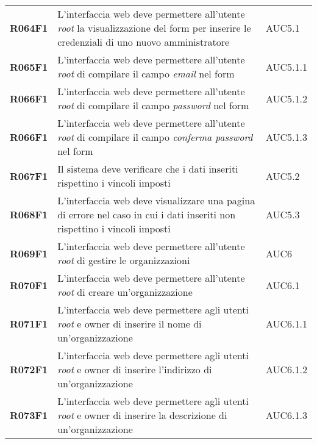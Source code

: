 \documentclass[../analisi-dei-requisiti]{subfiles}
\begin{document}
\begin{longtable}[H]{>{\centering\bfseries}m{3cm} >{\centering}m{10cm} >{\centering\arraybackslash}m{3cm}}
  R064F1                  & L'interfaccia web deve permettere all'utente \textit{root} la visualizzazione del form per inserire le credenziali di uno nuovo amministratore & AUC5.1                        \\
  R065F1                  & L'interfaccia web deve permettere all'utente \textit{root} di compilare il campo \textit{email} nel form                                       & AUC5.1.1                      \\
  R066F1                  & L'interfaccia web deve permettere all'utente \textit{root} di compilare il campo \textit{password} nel form                                    & AUC5.1.2                      \\
  R066F1                  & L'interfaccia web deve permettere all'utente \textit{root} di compilare il campo \textit{conferma password} nel form                           & AUC5.1.3                      \\
  R067F1                  & Il sistema deve verificare che i dati inseriti rispettino i vincoli imposti                                                                    & AUC5.2                        \\
  R068F1                  & L'interfaccia web deve visualizzare una pagina di errore nel caso in cui i dati inseriti non rispettino i vincoli imposti                      & AUC5.3                        \\
  R069F1                  & L'interfaccia web deve permettere all'utente \textit{root} di gestire le organizzazioni                                                        & AUC6                          \\
  R070F1                  & L'interfaccia web deve permettere all'utente \textit{root} di creare un'organizzazione                                                         & AUC6.1                        \\
  R071F1                  & L'interfaccia web deve permettere agli utenti \textit{root} e owner di inserire il nome di un'organizzazione                                   & AUC6.1.1                      \\
  R072F1                  & L'interfaccia web deve permettere agli utenti \textit{root} e owner di inserire l'indirizzo di un'organizzazione                               & AUC6.1.2                      \\
  R073F1                  & L'interfaccia web deve permettere agli utenti \textit{root} e owner di inserire la descrizione di un'organizzazione                            & AUC6.1.3                      \\

\end{longtable}
\end{document}
